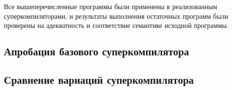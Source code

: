 \begin{itemize}
\end{itemize}

Все вышеперечисленные программы были применены в реализованным суперкомпиляторами, и результаты
выполнения остаточных программ были проверены на адекватность и соответствие семантике исходной программы.

\subsection{Апробация базового суперкомпилятора \ukanren}


\subsection{Сравнение вариаций суперкомпилятора \ukanren}

